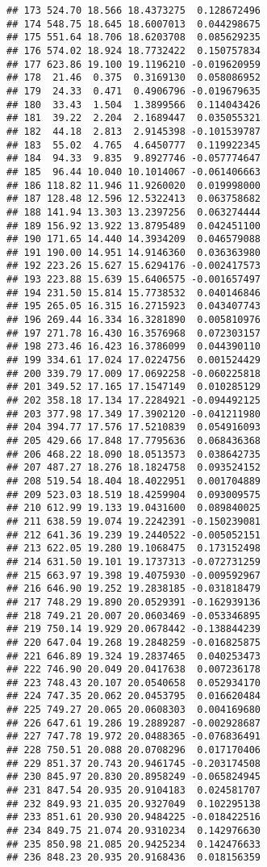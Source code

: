 \documentclass[]{book}
\theoremstyle{definition}
\theoremstyle{definition}
\theoremstyle{definition}
\theoremstyle{remark}
\begin{document}
\begin{verbatim}
## 173 524.70 18.566 18.4373275  0.128672496
## 174 548.75 18.645 18.6007013  0.044298675
## 175 551.64 18.706 18.6203708  0.085629235
## 176 574.02 18.924 18.7732422  0.150757834
## 177 623.86 19.100 19.1196210 -0.019620959
## 178  21.46  0.375  0.3169130  0.058086952
## 179  24.33  0.471  0.4906796 -0.019679635
## 180  33.43  1.504  1.3899566  0.114043426
## 181  39.22  2.204  2.1689447  0.035055321
## 182  44.18  2.813  2.9145398 -0.101539787
## 183  55.02  4.765  4.6450777  0.119922345
## 184  94.33  9.835  9.8927746 -0.057774647
## 185  96.44 10.040 10.1014067 -0.061406663
## 186 118.82 11.946 11.9260020  0.019998000
## 187 128.48 12.596 12.5322413  0.063758682
## 188 141.94 13.303 13.2397256  0.063274444
## 189 156.92 13.922 13.8795489  0.042451100
## 190 171.65 14.440 14.3934209  0.046579088
## 191 190.00 14.951 14.9146360  0.036363980
## 192 223.26 15.627 15.6294176 -0.002417573
## 193 223.88 15.639 15.6406575 -0.001657497
## 194 231.50 15.814 15.7738532  0.040146846
## 195 265.05 16.315 16.2715923  0.043407743
## 196 269.44 16.334 16.3281890  0.005810976
## 197 271.78 16.430 16.3576968  0.072303157
## 198 273.46 16.423 16.3786099  0.044390110
## 199 334.61 17.024 17.0224756  0.001524429
## 200 339.79 17.009 17.0692258 -0.060225818
## 201 349.52 17.165 17.1547149  0.010285129
## 202 358.18 17.134 17.2284921 -0.094492125
## 203 377.98 17.349 17.3902120 -0.041211980
## 204 394.77 17.576 17.5210839  0.054916093
## 205 429.66 17.848 17.7795636  0.068436368
## 206 468.22 18.090 18.0513573  0.038642735
## 207 487.27 18.276 18.1824758  0.093524152
## 208 519.54 18.404 18.4022951  0.001704889
## 209 523.03 18.519 18.4259904  0.093009575
## 210 612.99 19.133 19.0431600  0.089840025
## 211 638.59 19.074 19.2242391 -0.150239081
## 212 641.36 19.239 19.2440522 -0.005052151
## 213 622.05 19.280 19.1068475  0.173152498
## 214 631.50 19.101 19.1737313 -0.072731259
## 215 663.97 19.398 19.4075930 -0.009592967
## 216 646.90 19.252 19.2838185 -0.031818479
## 217 748.29 19.890 20.0529391 -0.162939136
## 218 749.21 20.007 20.0603469 -0.053346895
## 219 750.14 19.929 20.0678442 -0.138844239
## 220 647.04 19.268 19.2848259 -0.016825875
## 221 646.89 19.324 19.2837465  0.040253473
## 222 746.90 20.049 20.0417638  0.007236178
## 223 748.43 20.107 20.0540658  0.052934170
## 224 747.35 20.062 20.0453795  0.016620484
## 225 749.27 20.065 20.0608303  0.004169680
## 226 647.61 19.286 19.2889287 -0.002928687
## 227 747.78 19.972 20.0488365 -0.076836491
## 228 750.51 20.088 20.0708296  0.017170406
## 229 851.37 20.743 20.9461745 -0.203174508
## 230 845.97 20.830 20.8958249 -0.065824945
## 231 847.54 20.935 20.9104183  0.024581707
## 232 849.93 21.035 20.9327049  0.102295138
## 233 851.61 20.930 20.9484225 -0.018422516
## 234 849.75 21.074 20.9310234  0.142976630
## 235 850.98 21.085 20.9425234  0.142476633
## 236 848.23 20.935 20.9168436  0.018156359
\end{verbatim}
\end{document}
